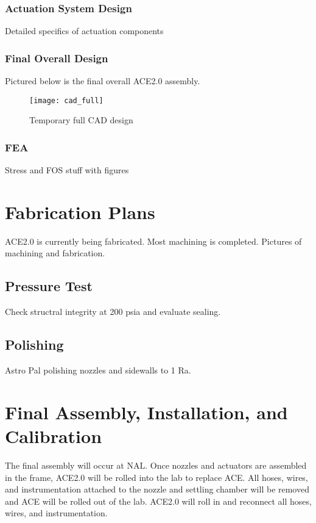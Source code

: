 \subsubsection{Actuation System Design}

Detailed specifics of actuation components

\subsubsection{Final Overall Design}

Pictured below is the final overall ACE2.0 assembly.

\begin{figure}[ht]
    \centering
    \texttt{[image: cad\_full]}
    \caption{Temporary full CAD design}
    \label{fig:cad_full}
\end{figure}

\subsubsection{FEA}

Stress and FOS stuff with figures

\section{Fabrication Plans}

ACE2.0 is currently being fabricated. Most machining is completed. Pictures of machining and fabrication.

\subsection{Pressure Test}

Check structral integrity at 200 psia and evaluate sealing.

\subsection{Polishing}

Astro Pal polishing nozzles and sidewalls to 1 Ra.

\section{Final Assembly, Installation, and Calibration}

The final assembly will occur at NAL. Once nozzles and actuators are assembled in the frame, ACE2.0 will be rolled into the lab to replace ACE. All hoses, wires, and instrumentation attached to the nozzle and settling chamber will be removed and ACE will be rolled out of the lab. ACE2.0 will roll in and reconnect all hoses, wires, and instrumentation.

